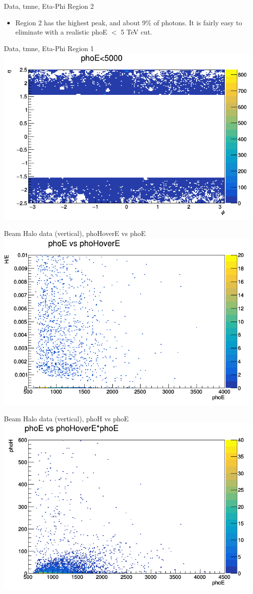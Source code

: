 \documentclass{beamer}
\begin{document}
\begin{frame}{Data, tmne, Eta-Phi Region 2}
    \begin{itemize}
        \item Region 2 has the highest peak, and about 9\% of photons.
        \itme It is fairly easy to eliminate with a realistic phoE $<$ 5 TeV cut.
    \end{itemize}{}
\end{frame}
\begin{frame}{Data, tmne, Eta-Phi Region 1}
    \includegraphics[width=\linewidth]{phoPhi_vs_phoEta_anTGCtree_data_tmne_2345.png}
\end{frame}
\begin{frame}{Beam Halo data (vertical), phoHoverE vs phoE}
    \includegraphics[width=\linewidth]{phoE_vs_phoHoverE_anTGCtree_data_bhvertical.png}
\end{frame}
\begin{frame}{Beam Halo data (vertical), phoH vs phoE}
    \includegraphics[width=\linewidth]{phoE_vs_phoH_anTGCtree_data_bhvertical.png}
\end{frame}
\end{document}

